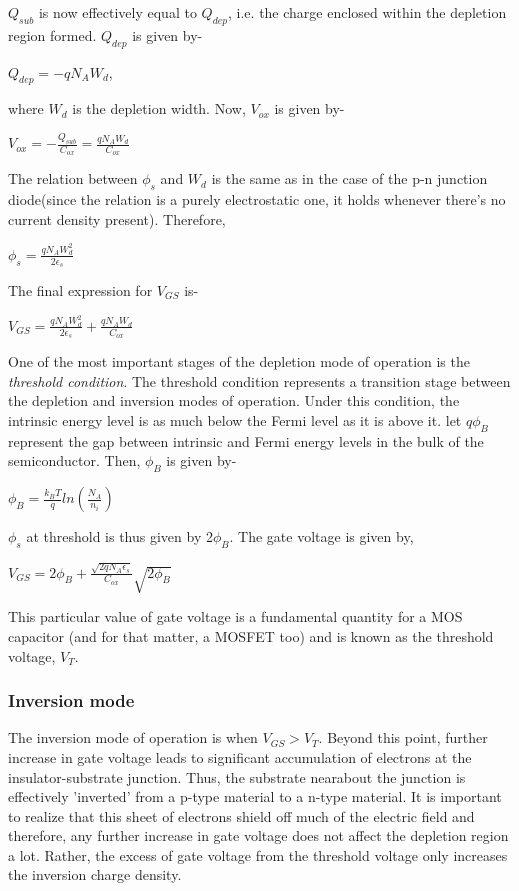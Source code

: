 \documentclass[12 pt]{article}
\begin{document}
$Q_{sub}$ is now effectively equal to $Q_{dep}$, i.e. the charge enclosed within the depletion region formed. $Q_{dep}$ is given by-
\begin{center}
    $Q_{dep} = -qN_{A}W_{d}$,
\end{center}
where $W_{d}$ is the depletion width. Now, $V_{ox}$ is given by-
\begin{center}
    $ V_{ox} = -\frac{Q_{sub}}{C_{ox}} = \frac{qN_{A}W_{d}}{C_{ox}}$
\end{center}
The relation between $\phi_{s}$ and $W_{d}$ is the same as in the case of the p-n junction diode(since the relation is a purely electrostatic one, it holds whenever there's no current density present). Therefore,
\begin{center}
    $\phi_{s} = \frac{qN_{A}W_{d}^{2}}{2\epsilon_{s}}$
\end{center}
The final expression for $V_{GS}$ is-
\begin{center}
    $V_{GS} = \frac{qN_{A}W_{d}^{2}}{2\epsilon_{s}} + \frac{qN_{A}W_{d}}{C_{ox}}$
\end{center}

One of the most important stages of the depletion mode of operation is the \emph{threshold condition}. The threshold condition represents a transition stage between the depletion and inversion modes of operation. Under this condition, the intrinsic energy level is as much below the Fermi level as it is above it. let $q\phi_{B}$ represent the gap between intrinsic and Fermi energy levels in the bulk of the semiconductor. Then, $\phi_{B}$ is given by-
\begin{center}
    $\phi_{B} = \frac{k_{B}T}{q}ln(\frac{N_{A}}{n_{i}})$
\end{center}
$\phi_{s}$ at threshold is thus given by 2$\phi_{B}$. The gate voltage is given by,
\begin{center}
    $V_{GS} = 2\phi_{B} + \frac{\sqrt{2qN_{A}\epsilon_{s}}}{C_{ox}}\sqrt{2\phi_{B}}$
\end{center}
This particular value of gate voltage is a fundamental quantity for a MOS capacitor (and for that matter, a MOSFET too) and is known as the threshold voltage, $V_{T}$. 

\subsubsection{Inversion mode}

The inversion mode of operation is when $V_{GS} > V_{T}$. Beyond this point, further increase in gate voltage leads to significant accumulation of electrons at the insulator-substrate junction. Thus, the substrate nearabout the junction is effectively 'inverted' from a p-type material to a n-type material. It is important to realize that this sheet of electrons shield off much of the electric field and therefore, any further increase in gate voltage does not affect the depletion region a lot. Rather, the excess of gate voltage from the 
threshold voltage only increases the inversion charge density. \newline
\end{document}
